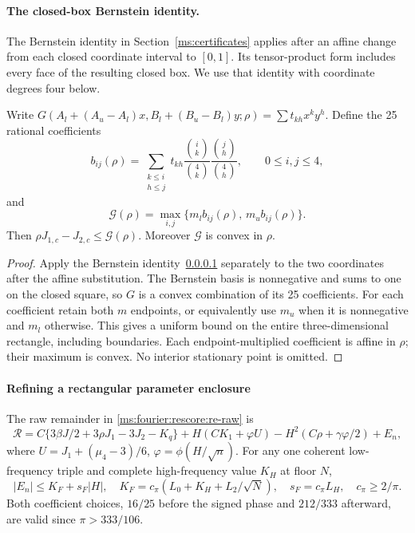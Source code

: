 \paragraph{The closed-box Bernstein identity.}\label{ms:fourier:rescore:re-bernstein}
The Bernstein identity in Section~\ref{ms:certificates} applies after an
affine change from each closed coordinate interval to $[0,1]$.
Its tensor-product form includes every face of the resulting closed box.
We use that identity with coordinate degrees four below.

\begin{lemma}\label{ms:fourier:rescore:entry201-central}
Write $G(A_l+(A_u-A_l)x,B_l+(B_u-B_l)y;\rho)
=\sum t_{kh}x^ky^h$. Define the 25 rational coefficients
\[
 b_{ij}(\rho)=\sum_{\substack{k\le i\\h\le j}}
 t_{kh}\frac{\binom{i}{k}}{\binom4k}
          \frac{\binom{j}{h}}{\binom4h},\qquad 0\le i,j\le4,
\]
and
\[
 \mathcal G(\rho)=\max_{i,j}
       \{m_l b_{ij}(\rho),\,m_u b_{ij}(\rho)\}.
\]
Then $\rho J_{1,c}-J_{2,c}\le\mathcal G(\rho)$.
Moreover $\mathcal G$ is convex in $\rho$.
\end{lemma}
\begin{proof}
Apply the Bernstein identity~\ref{ms:fourier:rescore:re-bernstein} separately to the
two coordinates after the affine substitution. The Bernstein basis is nonnegative and sums to one on the closed square,
so $G$ is a convex combination of its 25 coefficients.
For each coefficient retain both $m$ endpoints, or equivalently use
$m_u$ when it is nonnegative and $m_l$ otherwise. This gives a uniform
bound on the entire three-dimensional rectangle, including boundaries.
Each endpoint-multiplied coefficient is affine in $\rho$; their maximum
is convex. No interior stationary point is omitted.
\end{proof}

\paragraph{Refining a rectangular parameter enclosure}
\label{ms:fourier:rescore:entry-feedback}\label{ms:fourier:rescore:fourier-uniform}

The raw remainder in \eqref{ms:fourier:rescore:re-raw} is
\begin{equation}\label{ms:fourier:rescore:entry-remainder}
 \mathcal R=C\{3\beta J/2+3\rho J_1-3J_2-K_q\}
 +H(CK_1+\varphi U)-H^2(C\rho+\gamma\varphi/2)+E_n,
\end{equation}
where $U=J_1+(\mu_4-3)/6$, $\varphi=\phi(H/\sqrt n)$.
For any one coherent low-frequency triple and complete high-frequency value $K_H$ at floor $N$,
\begin{equation}\label{ms:fourier:rescore:entry-fourier-budget}
 |E_n|\le K_F+s_F|H|,\quad
 K_F=c_\pi(L_0+K_H+L_2/\sqrt N),\quad s_F=c_\pi L_H,\quad c_\pi\ge2/\pi.
\end{equation}
Both coefficient choices, $16/25$ before the signed phase and $212/333$
afterward, are valid since $\pi>333/106$.

